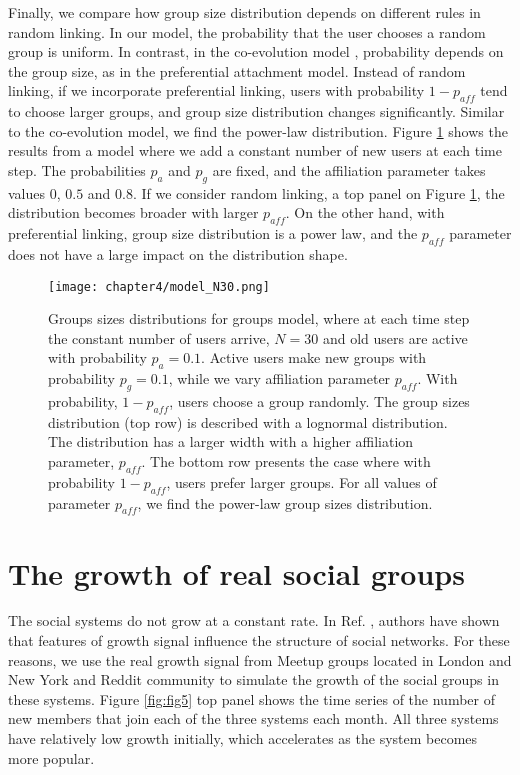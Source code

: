 Finally, we compare how group size distribution depends on different rules in random linking. In our model, the probability that the user chooses a random group is uniform. In contrast, in the co-evolution model \cite{zheleva2009co}, probability depends on the group size, as in the preferential attachment model. Instead of random linking, if we incorporate preferential linking, users with probability $1-p_{aff}$ tend to choose larger groups, and group size distribution changes significantly. Similar to the co-evolution model, we find the power-law distribution. Figure \ref{fig:model_comp} shows the results from a model where we add a constant number of new users at each time step. The probabilities $p_a$ and $p_g$ are fixed, and the affiliation parameter takes values $0$, $0.5$ and $0.8$. If we consider random linking, a top panel on Figure \ref{fig:model_comp}, the distribution becomes broader with larger $p_{aff}$. On the other hand, with preferential linking, group size distribution is a power law, and the $p_{aff}$ parameter does not have a large impact on the distribution shape.    

\begin{figure}[h]
	\centering
	\texttt{[image: chapter4/model\_N30.png]}
	\caption[Comparison between preferential and random linking in the groups' growth model.]{Groups sizes distributions for groups model, where at each time step the constant number of users arrive, $N=30$ and old users are active with probability $p_a=0.1$. Active users make new groups with probability $p_g=0.1$, while we vary affiliation parameter $p_{aff}$. With probability, $1-p_{aff}$, users choose a group randomly. The group sizes distribution (top row) is described with a lognormal distribution. The distribution has a larger width with a higher affiliation parameter, $p_{aff}$. The bottom row presents the case where with probability $1-p_{aff}$, users prefer larger groups. For all values of parameter $p_{aff}$, we find the power-law group sizes distribution.}
	\label{fig:model_comp}
\end{figure}

\newpage
\section{The growth of real social groups} 

The social systems do not grow at a constant rate. In Ref. \cite{vranic2021growth}, authors have shown that features of growth signal influence the structure of social networks. For these reasons, we use the real growth signal from Meetup groups located in London and New York and Reddit community to simulate the growth of the social groups in these systems. Figure \ref{fig:fig5} top panel shows the time series of the number of new members that join each of the three systems each month. All three systems have relatively low growth initially, which accelerates as the system becomes more popular.


